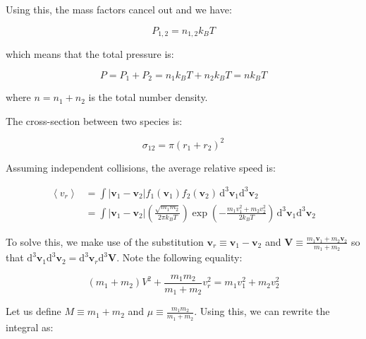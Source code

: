 \documentclass[12pt]{article}
\begin{document}
Using this, the mass factors cancel out and we have:

\begin{equation}
    P_{1, 2} = n_{1, 2} k_{B} T
\end{equation}

which means that the total pressure is:

\begin{equation}
    P = P_{1} + P_{2} = n_{1} k_{B} T + n_{2} k_{B} T = n k_{B} T
\end{equation}

where $n = n_{1} + n_{2}$ is the total number density.

The cross-section between two species is:

\begin{equation}
    \sigma_{12} = \pi (r_{1} + r_{2})^{2}
\end{equation}

Assuming independent collisions, the average relative speed is:

\begin{equation}
\begin{split}
    \left\langle v_{r} \right\rangle &= \int \left\lvert \mathbf{v}_{1} - \mathbf{v}_{2} \right\rvert f_{1}(\mathbf{v}_{1}) f_{2}(\mathbf{v}_{2}) \, \mathrm{d}^{3} \mathbf{v}_{1} \mathrm{d}^{3} \mathbf{v}_{2} \\
    &= \int \left\lvert \mathbf{v}_{1} - \mathbf{v}_{2} \right\rvert \left( \frac{\sqrt{m_{1}m_{2}}}{2\pi k_{B}T} \right) \exp\left( -\frac{m_{1}v_{1}^{2} + m_{2}v_{2}^{2}}{2k_{B}T} \right) \, \mathrm{d}^{3} \mathbf{v}_{1} \mathrm{d}^{3} \mathbf{v}_{2}
\end{split}
\end{equation}

To solve this, we make use of the substitution $\mathbf{v}_{r} \equiv \mathbf{v}_{1} - \mathbf{v}_{2}$ and $\mathbf{V} \equiv \frac{m_{1}\mathbf{v}_{1} + m_{2}\mathbf{v}_{2}}{m_{1} + m_{2}}$ so that $\mathrm{d}^{3} \mathbf{v}_{1} \mathrm{d}^{3} \mathbf{v}_{2} = \mathrm{d}^{3} \mathbf{v}_{r} \mathrm{d}^{3} \mathbf{V}$. Note the following equality:

\begin{equation}
    (m_{1} + m_{2}) V^{2} + \frac{m_{1}m_{2}}{m_{1} + m_{2}} v_{r}^{2} = m_{1}v_{1}^{2} + m_{2}v_{2}^{2}
\end{equation}

Let us define $M \equiv m_{1} + m_{2}$ and $\mu \equiv \frac{m_{1}m_{2}}{m_{1} + m_{2}}$. Using this, we can rewrite the integral as:
\end{document}
